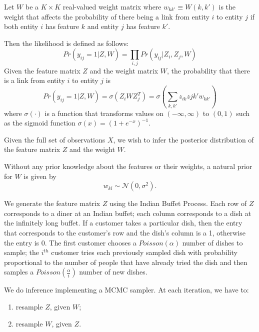 \documentclass[]{article}
\begin{document}
	Let $W$ be a $K \times K$ real-valued weight matrix where $w_{kk'} \equiv W(k, k')$ is the weight that affects the probability of there being a link from entity $i$ to entity $j$ if both entity $i$ has feature $k$ and entity $j$ has feature $k'$.
	
	Then the likelihood is defined as follows:
	$$
	Pr(y_{ij}=1|Z,W) = \prod_{i,j}Pr(y_{ij}|Z_i,Z_j,W)
	$$
	Given the feature matrix $Z$ and the weight matrix $W$, the probability that there is a link from entity $i$ to entity $j$ is
	$$
	Pr(y_{ij}=1|Z,W) = \sigma(Z_iWZ_j^T) = \sigma(\sum_{k,k'}z_{ik}z{jk'}w_{kk'}) 
	$$
	where $\sigma(\cdot)$ is a function that transforms values on $(-\infty, \infty)$ to $(0,1)$ such as the sigmoid function $\sigma(x) = (1+e^{-x})^{-1}$.
	
	Given the full set of observations $X$, we wish to infer the posterior distribution of the feature matrix $Z$ and the weight $W$.
	
	Without any prior knowledge about the features or their weights, a natural prior for $W$ is given by 
	$$
	w_{kl} \sim \mathcal{N}(0,\sigma^2).
	$$
	
	We generate the feature matrix $Z$ using the Indian Buffet Process. Each row of $Z$ corresponds to a diner at an Indian buffet; each column corresponds to a dish at the infinitely long buffet. If a customer takes a particular dish, then the entry that corresponds to the customer's row and the dish's column is a 1, otherwise the entry is 0. The first customer chooses a $Poisson(\alpha)$ number of dishes to sample; the $i^{th}$ customer tries each previously sampled dish with probability proportional to the number of people that have already tried the dish and then samples a $Poisson(\frac{\alpha}{i})$ number of new dishes. 
	
	We do inference implementing a MCMC sampler. At each iteration, we have to:
	\begin{enumerate}
		\item resample $Z$, given $W$;
		\item resample $W$, given $Z$.
	\end{enumerate}
	
\end{document}
